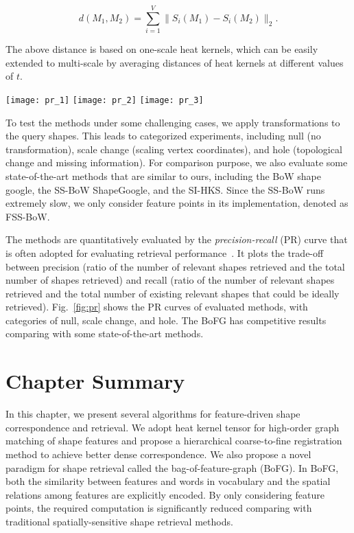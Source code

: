 \begin{equation}
d(M_1,M_2)=\sum_{i=1}^{V}\|S_i(M_1)-S_i(M_2) \|_2.
\end{equation}

The above distance is based on one-scale heat kernels, which can be easily extended to
multi-scale by averaging distances of heat kernels at different values of $t$.

\begin{figure*}[t]
\centering
\texttt{[image: pr\_1]}
\hspace{8pt}
\texttt{[image: pr\_2]}
\hspace{8pt}
\texttt{[image: pr\_3]}\\
\caption{Precision-recall curves of evaluated methods, with categories of (from \emph{Left} to \emph{Right}) null, scale change, and hole.}
\label{fig:pr}
\end{figure*}

To test the methods under some challenging cases, we apply transformations to
the query shapes. This leads to categorized experiments, including null (no
transformation), scale change (scaling vertex coordinates), and hole
(topological change and missing information). For comparison purpose, we also
evaluate some state-of-the-art methods that are similar to ours, including the
BoW shape google, the SS-BoW ShapeGoogle, and the SI-HKS. Since the SS-BoW
runs extremely slow, we only consider feature points in its implementation,
denoted as FSS-BoW.

The methods are quantitatively evaluated by the \emph{precision-recall} (PR)
curve that is often adopted for evaluating retrieval performance~\cite{FunkhouserMinKazhdanEtAl2003}.
It plots the trade-off between precision (ratio of the number of relevant
shapes retrieved and the total number of shapes retrieved) and recall
(ratio of the number of relevant shapes retrieved and the total number
of existing relevant shapes that could be ideally
retrieved). Fig.~\ref{fig:pr} shows the PR curves of evaluated
methods, with categories of null, scale change, and hole.
The BoFG has competitive results comparing with some state-of-the-art
methods.

\section{Chapter Summary}

In this chapter, we present several algorithms for feature-driven shape
correspondence and retrieval. We adopt heat kernel tensor for high-order
graph matching of shape features and propose a hierarchical coarse-to-fine
registration method to achieve better dense correspondence. We also propose
a novel paradigm for shape retrieval called the bag-of-feature-graph (BoFG).
In BoFG, both the similarity between features and words in vocabulary and
the spatial relations among features are explicitly encoded. By only considering
feature points, the required computation is significantly reduced comparing
with traditional spatially-sensitive shape retrieval methods.
